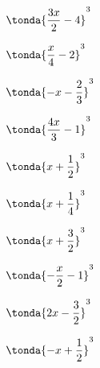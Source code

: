 \begin{esercizio}
\begin{htmulticols}{4}
\begin{enumeratea}
\item \(\tonda{\dfrac{3 x}{2} - 4}^{3}\) %
\item \(\tonda{\dfrac{x}{4} - 2}^{3}\) %
\item \(\tonda{- x - \dfrac{2}{3}}^{3}\) %
\item \(\tonda{\dfrac{4 x}{3} - 1}^{3}\) %
\item \(\tonda{x + \dfrac{1}{2}}^{3}\) %
\item \(\tonda{x + \dfrac{1}{4}}^{3}\) %
\item \(\tonda{x + \dfrac{3}{2}}^{3}\) %
\item \(\tonda{- \dfrac{x}{2} - 1}^{3}\) %
\item \(\tonda{2 x - \dfrac{3}{2}}^{3}\) %
\item \(\tonda{- x + \dfrac{1}{2}}^{3}\) %
% 

\end{enumeratea}
\end{htmulticols}
\end{esercizio}
